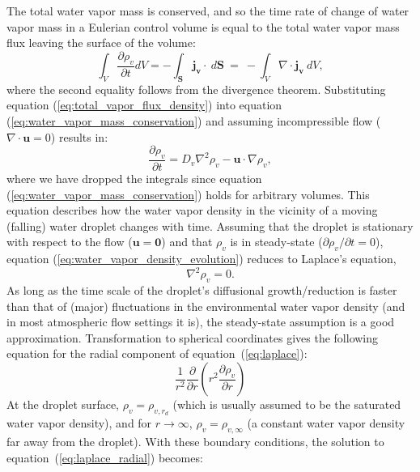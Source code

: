 \documentclass{report}
\begin{document}
The total water vapor mass is conserved, and so the time rate of change of water vapor mass in a Eulerian control volume is equal to the total water vapor mass flux leaving the surface of the volume:
\begin{equation}
    \int_V \frac{\partial \rho_v}{\partial t} dV = - \int_{\mathbf{S}} \mathbf{j_v} \cdot ~d\mathbf{S} ~=~ - \int_V \nabla \cdot \mathbf{j_v} ~dV,
    \label{eq:water_vapor_mass_conservation}
\end{equation}
where the second equality follows from the divergence theorem. Substituting equation (\ref{eq:total_vapor_flux_density}) into equation (\ref{eq:water_vapor_mass_conservation}) and assuming incompressible flow ($\nabla \cdot \mathbf{u} = 0$) results in:
\begin{equation}
    \frac{\partial \rho_v}{\partial t} = D_v \nabla^2 \rho_v - \mathbf{u} \cdot \nabla \rho_v,
    \label{eq:water_vapor_density_evolution}
\end{equation}
where we have dropped the integrals since equation (\ref{eq:water_vapor_mass_conservation}) holds for arbitrary volumes.
This equation describes how the water vapor density in the vicinity of a moving (falling) water droplet changes with time. Assuming that the droplet is stationary with respect to the flow ($\mathbf{u} = \mathbf{0}$) and that $\rho_v$ is in steady-state ($\partial \rho_v / \partial t = 0$), equation (\ref{eq:water_vapor_density_evolution}) reduces to Laplace's equation,
\begin{equation}
    \nabla^2 \rho_v = 0.
    \label{eq:laplace}
\end{equation}
As long as the time scale of the droplet's diffusional growth/reduction is faster than that of (major) fluctuations in the environmental water vapor density (and in most atmospheric flow settings it is), the steady-state assumption is a good approximation. Transformation to spherical coordinates gives the following equation for the radial component of equation~(\ref{eq:laplace}):
\begin{equation}
    \frac{1}{r^2}\frac{\partial}{\partial r} \left(r^2 \frac{\partial \rho_v}{\partial r} \right)
    \label{eq:laplace_radial}
\end{equation}
At the droplet surface, $\rho_v = \rho_{v, r_d}$ (which is usually assumed to be the saturated water vapor density), and for $r \rightarrow \infty$, $\rho_v = \rho_{v, \infty}$ (a constant water vapor density far away from the droplet). With these boundary conditions, the solution to equation~(\ref{eq:laplace_radial}) becomes:
\end{document}
